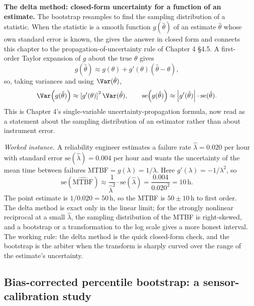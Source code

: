 \begin{mastery}
\textbf{The delta method: closed-form uncertainty for a function
of an estimate.} The bootstrap resamples to find the sampling
distribution of a statistic. When the statistic is a smooth
function $g(\hat\theta)$ of an estimate $\hat\theta$ whose own
standard error is known, the  gives the
answer in closed form and connects this chapter to the
propagation-of-uncertainty rule of Chapter 4 §4.5. A first-order
Taylor expansion of $g$ about the true $\theta$ gives
\[
g(\hat\theta) \approx g(\theta) + g'(\theta)(\hat\theta - \theta),
\]
so, taking variances and using $\Var(\hat\theta)$,
\[
\Var\!\left(g(\hat\theta)\right) \approx
\left[g'(\theta)\right]^{2} \Var(\hat\theta),
\qquad
\text{se}\!\left(g(\hat\theta)\right) \approx
\left|g'(\hat\theta)\right| \cdot \text{se}(\hat\theta).
\]
This is Chapter 4's single-variable uncertainty-propagation
formula, now read as a statement about the sampling distribution
of an estimator rather than about instrument error.

\smallskip
\textit{Worked instance.} A reliability engineer estimates a
failure rate $\hat\lambda = 0.020$ per hour with standard error
$\text{se}(\hat\lambda) = 0.004$ per hour and wants the
uncertainty of the mean time between failures
$\text{MTBF} = g(\lambda) = 1/\lambda$. Here
$g'(\lambda) = -1/\lambda^{2}$, so
\[
\text{se}(\widehat{\text{MTBF}}) \approx
\frac{1}{\hat\lambda^{2}} \cdot \text{se}(\hat\lambda)
= \frac{0.004}{0.020^{2}} = 10\,\si{\hour}.
\]
The point estimate is $1/0.020 = 50\,\si{\hour}$, so the MTBF is
$50 \pm 10\,\si{\hour}$ to first order. The delta method is exact
only in the linear limit; for the strongly nonlinear reciprocal at
a small $\hat\lambda$, the sampling distribution of the MTBF is
right-skewed, and a bootstrap or a transformation to the log scale
gives a more honest interval. The working rule: the delta method
is the quick closed-form check, and the bootstrap is the arbiter
when the transform is sharply curved over the range of the
estimate's uncertainty.
\end{mastery}

\subsection{Bias-corrected percentile bootstrap: a sensor-calibration
study}

